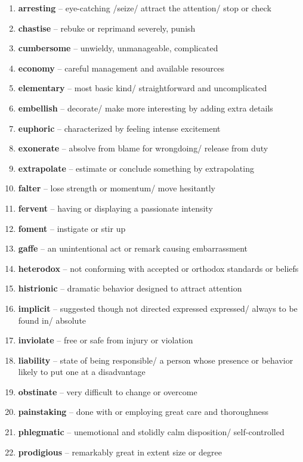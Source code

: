\begin{enumerate}[wide,labelindent=0pt]
\item \textbf{arresting} -- eye-catching /seize/ attract the attention/ stop or check
\item \textbf{chastise} -- rebuke or reprimand severely, punish
\item \textbf{cumbersome} -- unwieldy, unmanageable, complicated
\item \textbf{economy} -- careful management and available resources
\item \textbf{elementary} -- most basic kind/ straightforward and uncomplicated
\item \textbf{embellish} -- decorate/ make more interesting by adding extra details
\item \textbf{euphoric} -- characterized by feeling intense excitement
\item \textbf{exonerate} -- absolve from blame for wrongdoing/ release from duty
\item \textbf{extrapolate} -- estimate or conclude something by extrapolating
\item \textbf{falter} -- lose strength or momentum/ move hesitantly
\item \textbf{fervent} -- having or displaying a passionate intensity
\item \textbf{foment} -- instigate or stir up
\item \textbf{gaffe} -- an unintentional act or remark causing embarrassment
\item \textbf{heterodox} -- not conforming with accepted or orthodox standards or beliefs
\item \textbf{histrionic} -- dramatic behavior designed to attract attention
\item \textbf{implicit} -- suggested though not directed expressed expressed/ always to be found in/ absolute
\item \textbf{inviolate} -- free or safe from injury or violation
\item \textbf{liability} -- state of being responsible/ a person whose presence or behavior likely to put one at a disadvantage
\item \textbf{obstinate} -- very difficult to change or overcome
\item \textbf{painstaking} -- done with or employing great care and thoroughness
\item \textbf{phlegmatic} -- unemotional and stolidly calm disposition/ self-controlled
\item \textbf{prodigious} -- remarkably great in extent size or degree

\end{enumerate}
